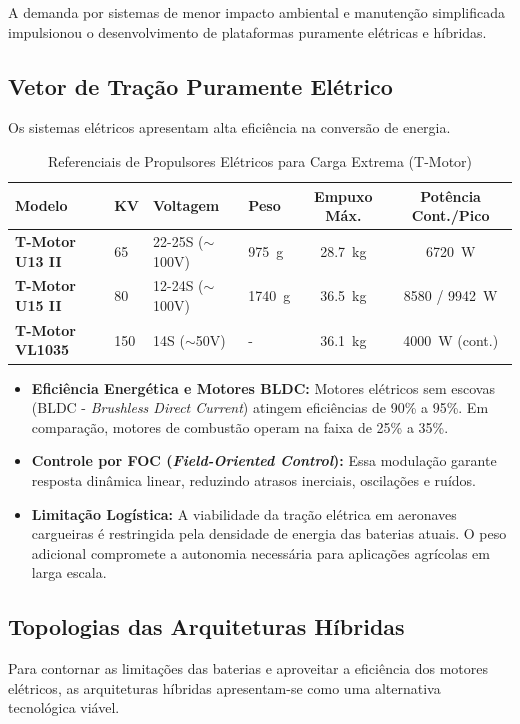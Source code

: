 \documentclass[a4paper,12pt]{article}
\begin{document}
A demanda por sistemas de menor impacto ambiental e manutenção simplificada impulsionou o desenvolvimento de plataformas puramente elétricas e híbridas.

\subsection{Vetor de Tração Puramente Elétrico}
Os sistemas elétricos apresentam alta eficiência na conversão de energia.

\begin{table}[H]
\centering
\caption{Referenciais de Propulsores Elétricos para Carga Extrema (T-Motor)}
\label{tab:motores_eletricos}
\small
\begin{tabularx}{\textwidth}{@{}lXllcc@{}}
\toprule
\textbf{Modelo} & \textbf{KV} & \textbf{Voltagem} & \textbf{Peso} & \textbf{Empuxo Máx.} & \textbf{Potência Cont./Pico} \\ \midrule
\textbf{T-Motor U13 II} & 65 & 22-25S ($\sim$100V) & \SI{975}{g} & \SI{28.7}{kg} & \SI{6720}{W}  \\
\textbf{T-Motor U15 II} & 80 & 12-24S ($\sim$100V) & \SI{1740}{g} & \SI{36.5}{kg} & 8580 / \SI{9942}{W}  \\
\textbf{T-Motor VL1035} & 150 & 14S ($\sim$50V) & - & \SI{36.1}{kg} & \SI{4000}{W} (cont.)  \\ \bottomrule
\end{tabularx}
\end{table}

\begin{itemize}
    \item \textbf{Eficiência Energética e Motores BLDC:} Motores elétricos sem escovas (BLDC - \textit{Brushless Direct Current}) atingem eficiências de 90\% a 95\%. Em comparação, motores de combustão operam na faixa de 25\% a 35\%.
    \item \textbf{Controle por FOC (\textit{Field-Oriented Control}):} Essa modulação garante resposta dinâmica linear, reduzindo atrasos inerciais, oscilações e ruídos.
    \item \textbf{Limitação Logística:} A viabilidade da tração elétrica em aeronaves cargueiras é restringida pela densidade de energia das baterias atuais. O peso adicional compromete a autonomia necessária para aplicações agrícolas em larga escala.
\end{itemize}

\subsection{Topologias das Arquiteturas Híbridas}
Para contornar as limitações das baterias e aproveitar a eficiência dos motores elétricos, as arquiteturas híbridas apresentam-se como uma alternativa tecnológica viável.
\end{document}
